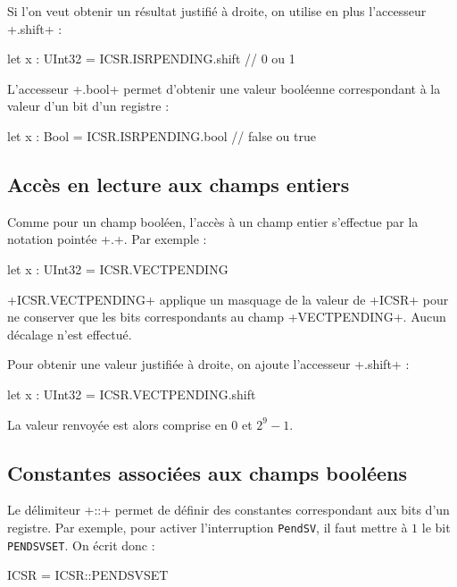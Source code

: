 Si l'on veut obtenir un résultat justifié à droite, on utilise en plus l'accesseur \plm+.shift+ :
\begin{PLM}
let x : UInt32 = ICSR.ISRPENDING.shift // 0 ou 1
\end{PLM}

L'accesseur  \plm+.bool+ permet d'obtenir une valeur booléenne correspondant à la valeur d'un bit d'un registre :
\begin{PLM}
let x : Bool = ICSR.ISRPENDING.bool // false ou true
\end{PLM}











\subsection{Accès en lecture aux champs entiers}

Comme pour un champ booléen, l'accès à un champ entier s'effectue par la notation pointée \plm+.+. Par exemple :
\begin{PLM}
let x : UInt32 = ICSR.VECTPENDING
\end{PLM}

\plm+ICSR.VECTPENDING+ applique un masquage de la valeur de \plm+ICSR+ pour ne conserver que les bits correspondants au champ \plm+VECTPENDING+. Aucun décalage n'est effectué.


Pour obtenir une valeur justifiée à droite, on ajoute l'accesseur \plm+.shift+ :
\begin{PLM}
let x : UInt32 = ICSR.VECTPENDING.shift
\end{PLM}

La valeur renvoyée est alors comprise en $0$ et $2^9-1$.



\subsection{Constantes associées aux champs booléens}

Le délimiteur \plm+::+ permet de définir des constantes correspondant aux bits d'un registre. Par exemple, pour activer l'interruption \texttt{PendSV}, il faut mettre à $1$ le bit \texttt{PENDSVSET}. On écrit donc :
\begin{PLM}
ICSR = ICSR::PENDSVSET
\end{PLM}


